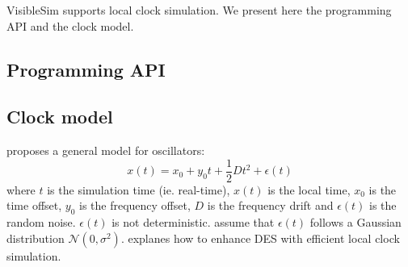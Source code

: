 \documentclass[11pt]{article}
\begin{document}
VisibleSim supports local clock simulation. We present here the programming API and the clock model.

\subsection{Programming API}

\subsection{Clock model}

\cite{allan1987time} proposes a general model for oscillators:
\begin{equation}
x(t) = x_0 + y_0t + \frac{1}{2}Dt^2 + \epsilon(t)
\end{equation}
where $t$ is the simulation time (ie. real-time), $x(t)$ is the local time, $x_0$ is the time offset, $y_0$ is the frequency offset, $D$ is the frequency drift and $\epsilon(t)$ is the random noise. $\epsilon(t)$ is not deterministic. \cite{ma2007understanding} assume that $\epsilon(t)$ follows a Gaussian distribution $\mathcal{N}(0,\sigma^2)$. \cite{ring2010clock} explanes how to enhance DES with efficient local clock simulation.



\end{document}
